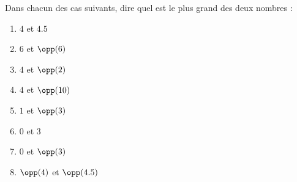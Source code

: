 
\begin{exercice}\label{exo2smath-0048}

Dans chacun des cas suivants, dire quel est le plus grand des deux nombres :
\begin{multicols}{2}
    \begin{enumerate}
        \item
            \( 4\) et \( 4.5\)
        \item
            \( 6\) et \( \opp(6)\)
        \item
            \( 4\) et \( \opp(2)\)
        \item
            \( 4\) et \( \opp(10)\)
        \item
            \( 1\) et \( \opp(3)\)
        \item
            \( 0\) et \( 3\)
        \item
            \( 0\) et \( \opp(3)\)
        \item
            \( \opp(4)\) et \( \opp(4.5)\)
    \end{enumerate}
\end{multicols}

\end{exercice}
